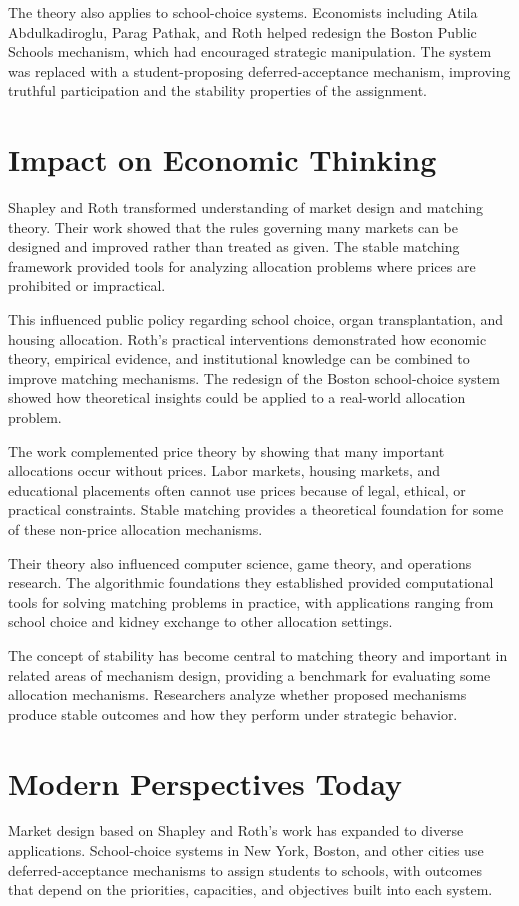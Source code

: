 The theory also applies to school-choice systems. Economists including Atila
Abdulkadiroglu, Parag Pathak, and Roth helped redesign the Boston Public Schools
mechanism, which had encouraged strategic manipulation. The system was replaced
with a student-proposing deferred-acceptance mechanism, improving truthful
participation and the stability properties of the assignment.

\section{Impact on Economic Thinking}
Shapley and Roth transformed understanding of market design and matching theory.
Their work showed that the rules governing many markets can be designed and
improved rather than treated as given. The stable matching framework provided
tools for analyzing allocation problems where prices are prohibited or impractical.

This influenced public policy regarding school choice, organ transplantation,
and housing allocation. Roth's practical interventions demonstrated how economic
theory, empirical evidence, and institutional knowledge can be combined to improve
matching mechanisms. The redesign of the Boston school-choice system showed how
theoretical insights could be applied to a real-world allocation problem.

The work complemented price theory by showing that many important allocations
occur without prices. Labor markets, housing markets, and educational placements
often cannot use prices because of legal, ethical, or practical constraints.
Stable matching provides a theoretical foundation for some of these non-price
allocation mechanisms.

Their theory also influenced computer science, game theory, and operations
research. The algorithmic foundations they established provided computational
tools for solving matching problems in practice, with applications ranging from
school choice and kidney exchange to other allocation settings.

The concept of stability has become central to matching theory and important in
related areas of mechanism design, providing a benchmark for evaluating some
allocation mechanisms. Researchers analyze whether proposed mechanisms produce
stable outcomes and how they perform under strategic behavior.

\section{Modern Perspectives Today}
Market design based on Shapley and Roth's work has expanded to diverse
applications. School-choice systems in New York, Boston, and other cities use
deferred-acceptance mechanisms to assign students to schools, with outcomes that
depend on the priorities, capacities, and objectives built into each system.

